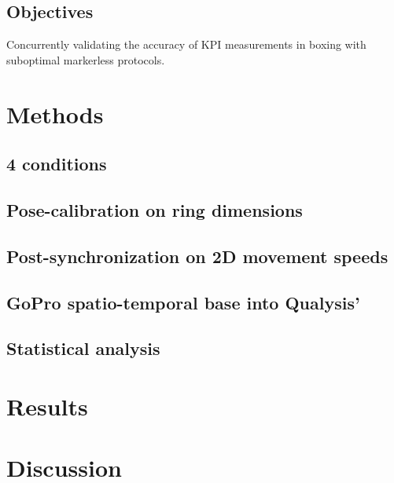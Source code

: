 

\subsection{Objectives}

Concurrently validating the accuracy of KPI measurements in boxing with suboptimal markerless protocols.


\section{Methods}
\subsection{4 conditions}
\blindtext

\subsection{Pose-calibration on ring dimensions}
\blindtext

\subsection{Post-synchronization on 2D movement speeds}
\blindtext

\subsection{GoPro spatio-temporal base into Qualysis'}
\blindtext

\subsection{Statistical analysis}
\blindtext


\section{Results}
\blindtext


\section{Discussion}

